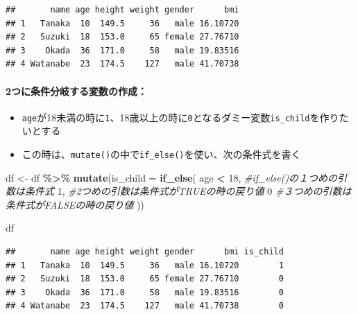 \documentclass[
]{book}
\newenvironment{Shaded}{\begin{snugshade}}{\end{snugshade}}
\newcommand{\AttributeTok}[1]{\textcolor[rgb]{0.13,0.29,0.53}{#1}}
\newcommand{\CommentTok}[1]{\textcolor[rgb]{0.56,0.35,0.01}{\textit{#1}}}
\newcommand{\DecValTok}[1]{\textcolor[rgb]{0.00,0.00,0.81}{#1}}
\newcommand{\FunctionTok}[1]{\textcolor[rgb]{0.13,0.29,0.53}{\textbf{#1}}}
\newcommand{\NormalTok}[1]{#1}
\newcommand{\OtherTok}[1]{\textcolor[rgb]{0.56,0.35,0.01}{#1}}
\newcommand{\SpecialCharTok}[1]{\textcolor[rgb]{0.81,0.36,0.00}{\textbf{#1}}}
\providecommand{\tightlist}{%
  \setlength{\itemsep}{0pt}\setlength{\parskip}{0pt}}
\begin{document}
\begin{verbatim}
##       name age height weight gender      bmi
## 1   Tanaka  10  149.5     36   male 16.10720
## 2   Suzuki  18  153.0     65 female 27.76710
## 3    Okada  36  171.0     58   male 19.83516
## 4 Watanabe  23  174.5    127   male 41.70738
\end{verbatim}

\hypertarget{ux3064ux306bux6761ux4ef6ux5206ux5c90ux3059ux308bux5909ux6570ux306eux4f5cux6210}{%
\paragraph*{2つに条件分岐する変数の作成：}\label{ux3064ux306bux6761ux4ef6ux5206ux5c90ux3059ux308bux5909ux6570ux306eux4f5cux6210}}

\begin{itemize}
\tightlist
\item
  \texttt{age}が18未満の時に\texttt{1}、18歳以上の時に\texttt{0}となるダミー変数\texttt{is\_child}を作りたいとする
\item
  この時は、\texttt{mutate()}の中で\texttt{if\_else()}を使い、次の条件式を書く
\end{itemize}

\begin{Shaded}
\begin{Highlighting}[]
\NormalTok{df }\OtherTok{\textless{}{-}}\NormalTok{ df }\SpecialCharTok{\%\textgreater{}\%} 
  \FunctionTok{mutate}\NormalTok{(}\AttributeTok{is\_child =} 
           \FunctionTok{if\_else}\NormalTok{(}
\NormalTok{             age }\SpecialCharTok{\textless{}} \DecValTok{18}\NormalTok{, }\CommentTok{\#if\_else()の１つめの引数は条件式}
             \DecValTok{1}\NormalTok{, }\CommentTok{\#2つめの引数は条件式がTRUEの時の戻り値}
             \DecValTok{0} \CommentTok{\#３つめの引数は条件式がFALSEの時の戻り値}
\NormalTok{           )) }

\NormalTok{df}
\end{Highlighting}
\end{Shaded}

\begin{verbatim}
##       name age height weight gender      bmi is_child
## 1   Tanaka  10  149.5     36   male 16.10720        1
## 2   Suzuki  18  153.0     65 female 27.76710        0
## 3    Okada  36  171.0     58   male 19.83516        0
## 4 Watanabe  23  174.5    127   male 41.70738        0
\end{verbatim}
\end{document}

